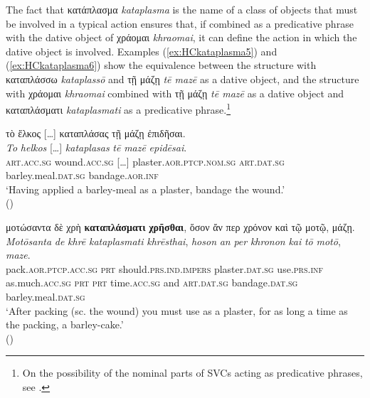 \documentclass[output=paper,colorlinks,citecolor=brown]{langscibook}
\begin{document}
The fact that κατάπλασμα \textit{kataplasma} is the name of a class of objects that must be involved in a typical action ensures that, if combined as a predicative phrase with the dative object of χράομαι \textit{khraomai}, it can define the action in which the dative object is involved. Examples (\ref{ex:HCkataplasma5}) and (\ref{ex:HCkataplasma6}) show the equivalence between the structure with καταπλάσσω \textit{kataplassō} and τῇ μάζῃ \textit{tē mazē} as a dative object, and the structure with χράομαι \textit{khraomai} combined with τῇ μάζῃ \textit{tē mazē} as a dative object and καταπλάσματι \textit{kataplasmati} as a predicative phrase.\footnote{On the possibility of the nominal parts of SVCs acting as predicative phrases, see \citet[122--123 and 127--128]{Pompei2017}.}

\begin{exe}
\ex\label{ex:HCkataplasma5}
\glll τὸ ἕλκος […] καταπλάσας τῇ μάζῃ ἐπιδῆσαι. \\ 
\textit{To} \textit{helkos} […] \textit{kataplasas} \textit{tē} \textit{mazē} \textit{epidēsai}.\\
\textsc{art.acc.sg} wound.\textsc{acc.sg} […] plaster.\textsc{aor.ptcp.nom.sg} \textsc{art.dat.sg} barley.meal.\textsc{dat.sg} bandage.\textsc{aor.inf} \\
\glt ‘Having applied a barley-meal as a plaster, bandage the wound.’ \\
\hspace*{\fill}()
\end{exe}

\begin{exe}
\ex\label{ex:HCkataplasma6}
\glll μοτώσαντα δὲ χρὴ \textbf{καταπλάσματι} \textbf{χρῆσθαι}, ὅσον ἄν περ χρόνον καὶ τῷ μοτῷ, μάζῃ. \\
\textit{Motōsanta} \textit{de} \textit{khrē} \textit{kataplasmati} \textit{khrēsthai}, \textit{hoson} \textit{an} \textit{per} \textit{khronon} \textit{kai} \textit{tō} \textit{motō}, \textit{maze}. \\
pack.\textsc{aor.ptcp.acc.sg} \textsc{prt} should.\textsc{prs.ind.impers} plaster.\textsc{dat.sg} use.\textsc{prs.inf} as.much.\textsc{acc.sg} \textsc{prt} \textsc{prt} time.\textsc{acc.sg} and \textsc{art.dat.sg} bandage.\textsc{dat.sg} barley.meal.\textsc{dat.sg} \\
\glt ‘After packing (sc. the wound) you must use as a plaster, for as long a time as the packing, a barley-cake.’ \\
\hspace*{\fill}()
\end{exe}
\end{document}
